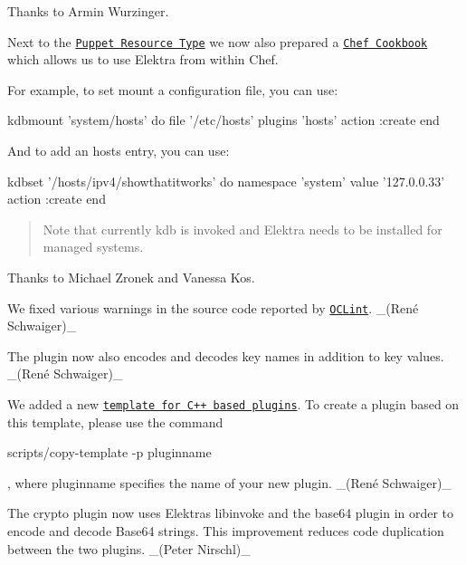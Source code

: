 Thanks to Armin Wurzinger.

Next to the \href{http://puppet.libelektra.org/}{\tt Puppet Resource Type} we now also prepared a \href{https://supermarket.chef.io/cookbooks/kdb}{\tt Chef Cookbook} which allows us to use Elektra from within Chef.

For example, to set mount a configuration file, you can use\+:


\begin{DoxyCode}
kdbmount 'system/hosts' do
        file '/etc/hosts'
        plugins 'hosts'
        action :create
end
\end{DoxyCode}


And to add an hosts entry, you can use\+:


\begin{DoxyCode}
kdbset '/hosts/ipv4/showthatitworks' do
        namespace 'system'
        value '127.0.0.33'
        action :create
end
\end{DoxyCode}


\begin{quote}
Note that currently {\ttfamily kdb} is invoked and Elektra needs to be installed for managed systems. \end{quote}


Thanks to Michael Zronek and Vanessa Kos.


\begin{DoxyItemize}
\item We fixed various warnings in the source code reported by \href{http://oclint.org}{\tt O\+C\+Lint}. \+\_\+(René Schwaiger)\+\_\+
\item The plugin now also encodes and decodes key names in addition to key values. \+\_\+(René Schwaiger)\+\_\+
\end{DoxyItemize}


\begin{DoxyItemize}
\item We added a new \href{https://www.libelektra.org/plugins/cpptemplate}{\tt template for C++ based plugins}. To create a plugin based on this template, please use the command
\end{DoxyItemize}


\begin{DoxyCode}
scripts/copy-template -p pluginname
\end{DoxyCode}


, where {\ttfamily pluginname} specifies the name of your new plugin. \+\_\+(René Schwaiger)\+\_\+


\begin{DoxyItemize}
\item The {\ttfamily crypto} plugin now uses Elektra\textquotesingle{}s {\ttfamily libinvoke} and the {\ttfamily base64} plugin in order to encode and decode Base64 strings. This improvement reduces code duplication between the two plugins. \+\_\+(\+Peter Nirschl)\+\_\+
\end{DoxyItemize}


